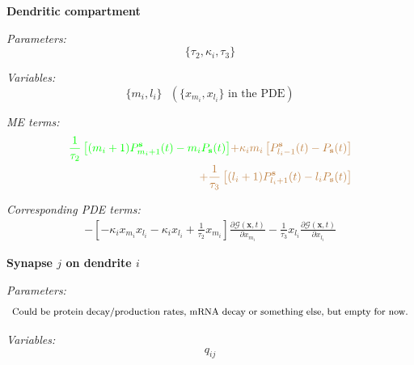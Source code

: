 \documentclass[a4paper, 11pt]{article}
\begin{document}
              {\bf Dendritic compartment}
              
              {\it Parameters:}
              \begin{equation*}
                \{\tau_2, \kappa_i, \tau_3\}
              \end{equation*}

              {\it Variables:}
              \begin{equation*}
                \{m_i, l_i\}\ \ \ \left(\{x_{m_i}, x_{l_i}\}\text{ in the PDE}\right)
              \end{equation*}

              
              {\it ME terms:}
              \begin{equation}
                \begin{split}
                  \textcolor{green}{\frac{1}{\tau_2}\left[(m_i+1)P_{m_i+1}^{\mathbf s}(t) - m_iP_{\mathbf s}(t)\right]} \textcolor{brown}{+ \kappa_im_i\left[P_{l_i-1}^{\mathbf s}(t) - P_{\mathbf s}(t)\right]}\\
                  \textcolor{brown}{+ \frac{1}{\tau_3}\left[(l_i+1)P_{l_i+1}^{\mathbf s}(t) - l_iP_{\mathbf s}(t)\right]}
                \end{split}
              \end{equation}
              
              {\it Corresponding PDE terms:}
              \begin{equation}
                \begin{split}
                  -\left[-\kappa_ix_{m_i}x_{l_i} - \kappa_ix_{l_i} + \frac{1}{\tau_2}x_{m_i}\right]\frac{\partial \mathcal G(\mathbf x, t)}{\partial x_{m_i}} - \frac{1}{\tau_3}x_{l_i}\frac{\partial\mathcal G(\mathbf x, t)}{\partial x_{l_i}}
                \end{split}
              \end{equation}


              {\bf Synapse $j$ on dendrite $i$}

              {\it Parameters:}
              \begin{equation*}
                \text{\footnotesize{Could be protein decay/production rates, mRNA decay or something else, but empty for now.}}
              \end{equation*}

              {\it Variables:}
              \begin{equation*}
                q_{ij}
              \end{equation*}
\end{document}
